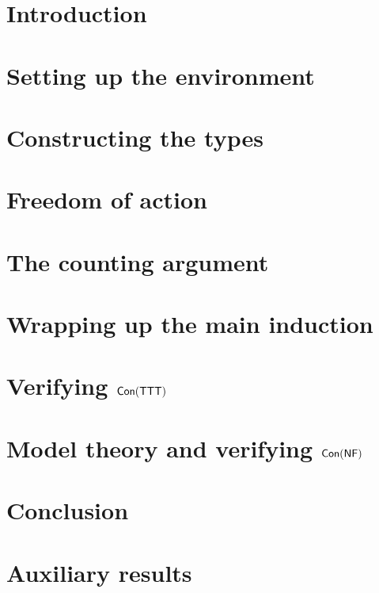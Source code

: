\chapter{Introduction}
\label{c:introduction}


\chapter{Setting up the environment}
\label{c:environment}


\chapter{Constructing the types}
\label{c:construction}


\chapter{Freedom of action}
\label{c:foa}


\chapter{The counting argument}
\label{c:counting}


\chapter{Wrapping up the main induction}
\label{c:induction}


\chapter{Verifying \texorpdfstring{\( \operatorname{\mathsf{Con}}(\mathsf{TTT}) \)}{Con(TTT)}}
\label{c:model}


\chapter{Model theory and verifying \texorpdfstring{\( \operatorname{\mathsf{Con}}(\mathsf{NF}) \)}{Con(NF)}}
\label{c:model_theory}


\chapter{Conclusion}
\label{c:conclusion}


\appendix
\chapter{Auxiliary results}
\label{c:auxiliary}




